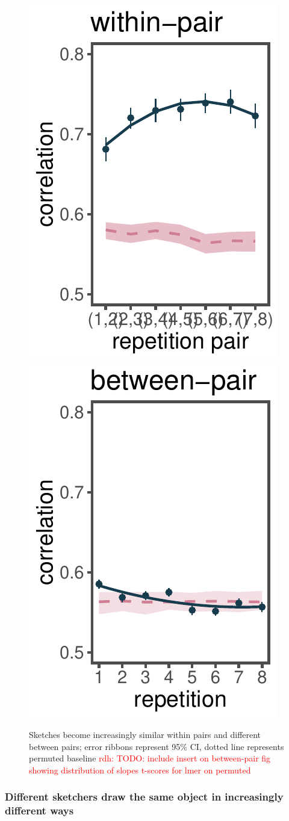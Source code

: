 \documentclass[10pt,letterpaper]{article}
\newcommand{\rdh}[1]{\textcolor{Red}{rdh: #1}}
\begin{document}
\begin{figure}
\includegraphics[width=0.45\linewidth]{figures/within.pdf}
\includegraphics[width=0.45\linewidth]{figures/across.pdf}
\caption{Sketches become increasingly similar within pairs and different between pairs; error ribbons represent 95\% CI, dotted line represents permuted baseline \rdh{TODO: include insert on between-pair fig showing distribution of slopes t-scores for lmer on permuted}}
\label{within-across}
\end{figure}

\subsubsection{Different sketchers draw the same object in increasingly different ways} 
\end{document}
